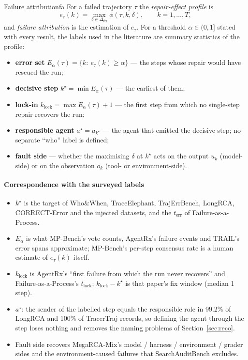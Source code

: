 \begin{definition}{Failure attribution}{fa}
For a failed trajectory $\tau$ the \emph{repair-effect profile} is
\[e_\tau(k)=\max_{\delta\in\Delta_{\mathrm{fix}}}\phi(\tau,k,\delta),\qquad k=1,\dots,T,\]
and \emph{failure attribution} is the estimation of $e_\tau$. For a threshold $\alpha\in(0,1]$ stated with every result, the labels used in the literature are summary statistics of the profile:
\begin{itemize}[leftmargin=1.1em]
\item \textbf{error set} $E_\alpha(\tau)=\{k:\ e_\tau(k)\ge\alpha\}$ --- the steps whose repair would have rescued the run;
\item \textbf{decisive step} $k^\star=\min E_\alpha(\tau)$ --- the earliest of them;
\item \textbf{lock-in} $k_{\mathrm{lock}}=\max E_\alpha(\tau)+1$ --- the first step from which no single-step repair recovers the run;
\item \textbf{responsible agent} $a^\star=a_{k^\star}$ --- the agent that emitted the decisive step; no separate ``who'' label is defined;
\item \textbf{fault side} --- whether the maximising $\delta$ at $k^\star$ acts on the output $u_k$ (model-side) or on the observation $o_k$ (tool- or environment-side).
\end{itemize}
\end{definition}

\paragraph{Correspondence with the surveyed labels}
\begin{itemize}[leftmargin=1.1em]
\item $k^\star$ is the target of Who\&When, TraceElephant, TrajErrBench, LongRCA, CORRECT-Error and the injected datasets, and the $t_{\mathrm{err}}$ of Failure-as-a-Process.
\item $E_\alpha$ is what MP-Bench's vote counts, AgentRx's failure events and TRAIL's error spans approximate; MP-Bench's per-step consensus rate is a human estimate of $e_\tau(k)$ itself.
\item $k_{\mathrm{lock}}$ is AgentRx's ``first failure from which the run never recovers'' and Failure-as-a-Process's $t_{\mathrm{lock}}$; $k_{\mathrm{lock}}-k^\star$ is that paper's fix window (median 1 step).
\item $a^\star$: the sender of the labelled step equals the responsible role in 99.2\% of LongRCA and 100\% of TracerTraj records, so defining the agent through the step loses nothing and removes the naming problems of Section~\ref{sec:reco}.
\item Fault side recovers MegaRCA-Mix's model / harness / environment / grader sides and the environment-caused failures that SearchAuditBench excludes.
\end{itemize}

